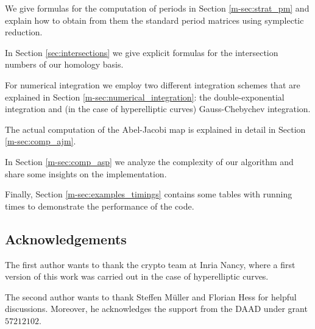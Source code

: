 \documentclass[main.tex]{subfiles}
\begin{document}
  We give formulas for the computation of periods in Section
  \ref{m-sec:strat_pm} and explain how to obtain from them the standard period
  matrices using symplectic reduction.

  In Section \ref{sec:intersections} we give explicit formulas for the
  intersection numbers of our homology basis.

  For numerical integration we employ two different integration schemes that
  are explained in Section \ref{m-sec:numerical_integration}: the
  double-exponential integration and
  (in the case of hyperelliptic curves) Gauss-Chebychev integration.

  The actual computation of the Abel-Jacobi map is explained in detail in
  Section \ref{m-sec:comp_ajm}.

  In Section \ref{m-sec:comp_asp} we analyze the complexity of our algorithm
  and share some insights on the implementation.

  Finally, Section \ref{m-sec:examples_timings} contains some tables with
  running times to demonstrate the performance of the code.

  \subsection{Acknowledgements}

  The first author wants to thank the crypto team at Inria Nancy, where
  a first version of this work was carried out in the case of hyperelliptic
  curves.

  The second author wants to thank Steffen Müller and Florian Hess for helpful discussions.
  Moreover, he acknowledges the support from the DAAD under grant $57212102$.
\end{document}

